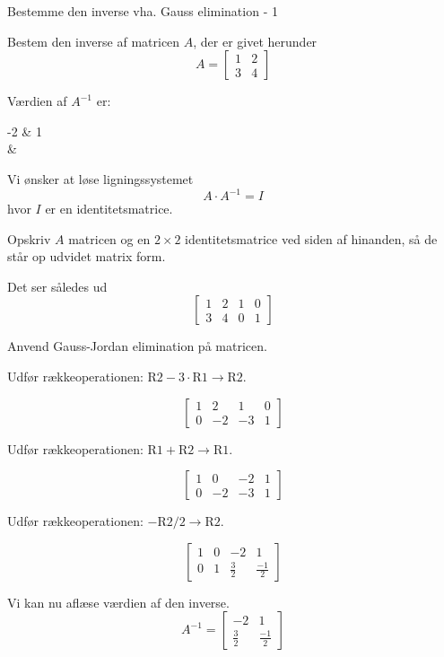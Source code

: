 \documentclass{article}
\begin{document}
\tableofcontents
\newpage

\begin{exercise}{Bestemme den inverse vha. Gauss elimination - 1}

Bestem den inverse af matricen $A$, der er givet herunder
\[
A = \left[\begin{array}{cc}
1 & 2 \\ 
3 & 4
\end{array} \right]
\]

Værdien af $A^{-1}$ er:
\begin{answermatrix}
-2 & 1 \\
 & 
\end{answermatrix}

\hint
Vi ønsker at løse ligningssystemet
\[
A \cdot A^{-1} = I
\]
hvor $I$ er en identitetsmatrice.

\hint
Opskriv $A$ matricen og en $2 \times 2$ identitetsmatrice
ved siden af hinanden, så de står op udvidet matrix form.

\hint
Det ser således ud
\[
\left[\begin{array}{cc|cc}
1 & 2 & 1 & 0 \\ 
3 & 4 & 0 & 1
\end{array} \right]
\]

\hint
Anvend Gauss-Jordan elimination på matricen.

\hint
Udfør rækkeoperationen: $\text{R2} - 3 \cdot \text{R1} \to \text{R2}$.

\hint
\[
\left[\begin{array}{cc|cc}
1 & 2 & 1 & 0 \\ 
0 & -2 & -3 & 1
\end{array} \right]
\]

\hint
Udfør rækkeoperationen: $\text{R1} + \text{R2} \to \text{R1}$.

\hint
\[
\left[\begin{array}{cc|cc}
1 & 0 & -2 & 1 \\ 
0 & -2 & -3 & 1
\end{array} \right]
\]

\hint
Udfør rækkeoperationen: $-\text{R2}/2 \to \text{R2}$.

\hint
\[
\left[\begin{array}{cc|cc}
1 & 0 & -2 & 1 \\ 
0 & 1 & \frac{3}{2} & \frac{-1}{2}
\end{array} \right]
\]

\hint
Vi kan nu aflæse værdien af den inverse.
\[
A^{-1} = \left[\begin{array}{cc}
-2 & 1 \\ 
\frac{3}{2} & \frac{-1}{2}
\end{array} \right]
\]

\end{exercise}
\end{document}
